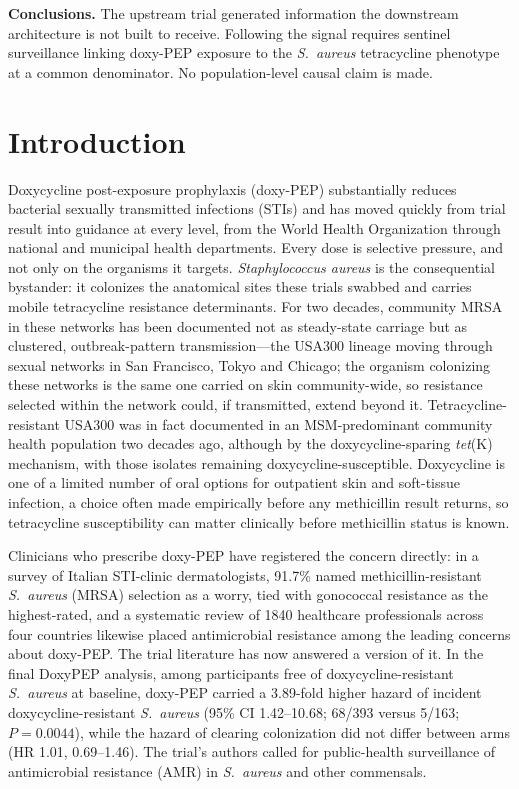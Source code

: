 \documentclass[12pt,a4paper]{article}
\newcommand{\sa}{\emph{S.~aureus}}
\newcommand{\Sa}{\emph{Staphylococcus aureus}}
\begin{document}
\noindent\textbf{Conclusions.} The upstream trial generated information the
downstream architecture is not built to receive. Following the signal requires
sentinel surveillance linking doxy-PEP exposure to the \sa{} tetracycline
phenotype at a common denominator. No population-level causal claim is made.

\vspace{1em}
\linenumbers

\section*{Introduction}

Doxycycline post-exposure prophylaxis (doxy-PEP) substantially reduces bacterial
sexually transmitted infections (STIs) and has moved quickly from trial result
into guidance at every level, from the World Health Organization through national
and municipal health departments.\cite{luetkemeyer2023,cdc2024doxypep} Every dose
is selective pressure, and not only on the organisms it targets. \Sa{} is the
consequential bystander: it colonizes the anatomical sites these trials swabbed
and carries mobile tetracycline resistance determinants.\cite{grossman2016} For
two decades, community MRSA in these networks has been documented not as
steady-state carriage but as clustered, outbreak-pattern transmission---the
USA300 lineage moving through sexual networks in San Francisco, Tokyo and
Chicago\cite{diep2008,dejong2025}; the organism colonizing these networks is the
same one carried on skin community-wide, so resistance selected within the
network could, if transmitted, extend beyond it. Tetracycline-resistant USA300
was in fact documented in an MSM-predominant community health population two
decades ago, although by the doxycycline-sparing \emph{tet}(K) mechanism, with
those isolates remaining doxycycline-susceptible.\cite{han2007} Doxycycline is
one of a limited number of oral options for outpatient skin and soft-tissue
infection, a choice often made empirically before any methicillin result
returns,\cite{stevens2014,liu2011} so tetracycline susceptibility can matter
clinically before methicillin status is known.

Clinicians who prescribe doxy-PEP have registered the concern directly: in a
survey of Italian STI-clinic dermatologists, 91.7\% named methicillin-resistant
\sa{} (MRSA) selection as a worry, tied with gonococcal resistance as the
highest-rated,\cite{dona2026} and a systematic review of 1840 healthcare
professionals across four countries likewise placed antimicrobial resistance
among the leading concerns about doxy-PEP.\cite{spence2026} The trial literature has now answered a version of
it. In the final DoxyPEP analysis, among participants free of
doxycycline-resistant \sa{} at baseline, doxy-PEP carried a 3.89-fold higher
hazard of incident doxycycline-resistant \sa{} (95\% CI 1.42--10.68; 68/393
versus 5/163; $P=0.0044$), while the hazard of clearing colonization did not
differ between arms (HR 1.01, 0.69--1.46).\cite{luetkemeyer2025} The trial's
authors called for public-health surveillance of antimicrobial resistance (AMR)
in \sa{} and other commensals.
\end{document}
